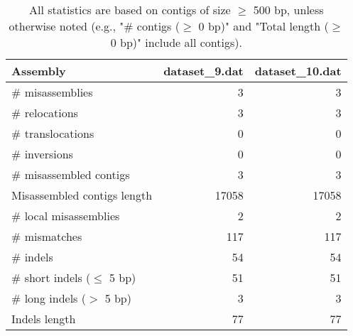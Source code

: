 \documentclass[12pt,a4paper]{article}
\begin{document}
\begin{table}[ht]
\begin{center}
\caption{All statistics are based on contigs of size $\geq$ 500 bp, unless otherwise noted (e.g., "\# contigs ($\geq$ 0 bp)" and "Total length ($\geq$ 0 bp)" include all contigs).}
\begin{tabular}{|l*{2}{|r}|}
\hline
Assembly & dataset\_9.dat & dataset\_10.dat \\ \hline
\# misassemblies & 3 & 3 \\ \hline
\hspace{5mm}\# relocations & 3 & 3 \\ \hline
\hspace{5mm}\# translocations & 0 & 0 \\ \hline
\hspace{5mm}\# inversions & 0 & 0 \\ \hline
\# misassembled contigs & 3 & 3 \\ \hline
Misassembled contigs length & 17058 & 17058 \\ \hline
\# local misassemblies & 2 & 2 \\ \hline
\# mismatches & 117 & 117 \\ \hline
\# indels & 54 & 54 \\ \hline
\hspace{5mm}\# short indels ($\leq$ 5 bp) & 51 & 51 \\ \hline
\hspace{5mm}\# long indels ($>$ 5 bp) & 3 & 3 \\ \hline
Indels length & 77 & 77 \\ \hline
\end{tabular}
\end{center}
\end{table}
\end{document}
